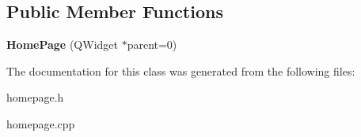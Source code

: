 \subsection*{Public Member Functions}
\begin{DoxyCompactItemize}
\item 
{\bfseries Home\+Page} (Q\+Widget $\ast$parent=0)\hypertarget{class_home_page_a11aaf93fd8a54885cf046c23501a07aa}{}\label{class_home_page_a11aaf93fd8a54885cf046c23501a07aa}

\end{DoxyCompactItemize}


The documentation for this class was generated from the following files\+:\begin{DoxyCompactItemize}
\item 
homepage.\+h\item 
homepage.\+cpp\end{DoxyCompactItemize}
